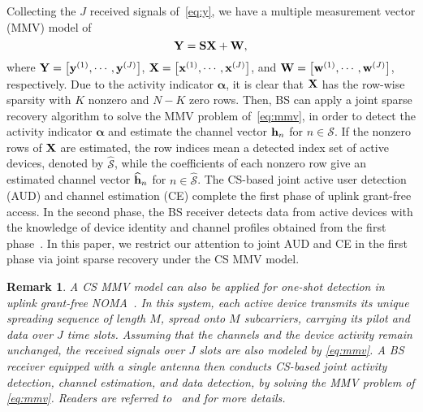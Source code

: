 \documentclass[journal]{IEEEtran}
\newcommand{\mS}{\mathcal{S}}
\newcommand{\hbu}{{\bf h}}
\newcommand{\xbu}{{\bf x}}
\newcommand{\ybu}{{\bf y}}
\newcommand{\wbu}{{\bf w}}
\newcommand{\Sbu}{{\bf S}}
\newcommand{\Wbu}{{\bf W}}
\newcommand{\Xbu}{{\bf X}}
\newcommand{\Ybu}{{\bf Y}}
\newcommand{\balp}{{\boldsymbol \alpha}}
\newtheorem{rem}{Remark}
\numberwithin{const2}{const}
\begin{document}
Collecting the $J$ received signals of~\eqref{eq:y}, 
we have a multiple measurement vector (MMV) %
model of
\begin{equation}\label{eq:mmv}
\Ybu = \Sbu \Xbu + \Wbu,
\end{equation}
where $\Ybu = \left[\ybu^{(1)}, \cdots, \ybu^{(J)} \right]$,
$\Xbu = \left[\xbu^{(1)}, \cdots, \xbu^{(J)} \right]$,
and $\Wbu = \left[\wbu^{(1)}, \cdots, \wbu^{(J)} \right]$, respectively.
Due to the activity indicator $\balp$, 
it is clear that $\Xbu$ has the row-wise sparsity with $K$ nonzero 
and $N-K$ zero rows.
Then, BS can apply
a joint sparse recovery algorithm to solve the MMV problem of~\eqref{eq:mmv},
in order to detect the activity indicator $\balp$ and estimate the channel vector $\hbu_n$ for $n \in \mS$.
If the nonzero rows of $\Xbu$ are estimated,
the row indices mean a detected index set of active devices, denoted by $\widehat{\mS}$, 
while the coefficients of each nonzero row give %
an estimated channel vector $\widehat{\hbu}_n$ for $n \in \widehat{\mS}$. %
The CS-based joint active user detection (AUD) and channel estimation (CE)
complete the first phase of uplink grant-free access.
In the second phase, the BS receiver detects data from active devices
with the knowledge of device identity and channel profiles obtained from the first phase~\cite{Liu:mimo, Liu:massive}.
In this paper, we restrict our attention to joint AUD and CE in the first phase
via joint sparse recovery under the CS MMV model.

\begin{rem}\label{rm:one}
A CS MMV model can also be applied for \emph{one-shot} detection
in uplink grant-free NOMA~\cite{Du:joint, Yu:binary}.
In this system, each active device transmits its unique spreading sequence of length $M$,
spread onto $M$ subcarriers,  %
carrying its pilot and data over $J$ time slots.
Assuming that the channels and the device activity remain unchanged, %
the received signals over $J$ slots are also modeled by \eqref{eq:mmv}.
A BS receiver equipped with a single antenna
then conducts CS-based joint activity detection, channel estimation, and data detection,
by solving the MMV problem of \eqref{eq:mmv}.
Readers are referred to~\cite{Du:joint} and \cite{Yu:binary} for more details.
\end{rem}
\end{document}
